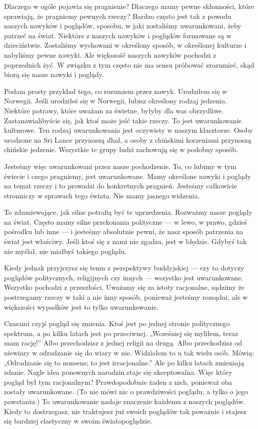 \documentclass[12pt,openany]{book}
\begin{document}
Dlaczego w ogóle pojawia się pragnienie? Dlaczego mamy pewne skłonności, które sprawiają, że pragniemy pewnych rzeczy? Bardzo często jest tak z powodu naszych nawyków i poglądów, sposobu, w jaki zostaliśmy uwarunkowani, żeby patrzeć na świat. Niektóre z naszych nawyków i poglądów formowane są w dzieciństwie. Zostaliśmy wychowani w określony sposób, w określonej kulturze i nabyliśmy pewne nawyki. Ale większość naszych nawyków pochodzi z poprzednich żyć. W związku z tym często nie ma sensu próbować zrozumieć, skąd biorą się nasze nawyki i poglądy.

Podam prosty przykład tego, co rozumiem przez nawyk. Urodziłem się w Norwegii. Jeśli urodziłeś się w Norwegii, lubisz określony rodzaj jedzenia. Niektóre potrawy, które uważam za świetne, byłyby dla was obrzydliwe. Zastanawialibyście się, jak ktoś może jeść takie rzeczy. To jest uwarunkowanie kulturowe. Ten rodzaj uwarunkowania jest oczywisty w naszym klasztorze. Osoby urodzone na Sri Lance przynoszą dhal, a osoby z chińskimi korzeniami przynoszą chińskie jedzenie. Wszystkie te grupy ludzi zachowują się w podobny sposób.

Jesteśmy więc uwarunkowani przez nasze pochodzenie. To, co lubimy w tym świecie i czego pragniemy, jest uwarunkowane. Mamy określone nawyki i poglądy na temat rzeczy i to prowadzi do konkretnych pragnień. Jesteśmy całkowicie stronniczy w sprawach tego świata. Nie mamy jasnego widzenia.

To zdumiewające, jak silne potrafią być te uprzedzenia. Rozważmy nasze poglądy na świat. Często mamy silne przekonania polityczne --- w lewo, w prawo, gdzieś pośrodku lub inne --- i jesteśmy absolutnie pewni, że nasz sposób patrzenia na świat jest właściwy. Jeśli ktoś się z nami nie zgadza, jest w błędzie. Gdybyś tak nie myślał, nie miałbyś takiego poglądu.

Kiedy jednak przyjrzysz się temu z perspektywy buddyjskiej --- czy to dotyczy poglądów politycznych, religijnych czy innych --- wszystko jest uwarunkowane. Wszystko pochodzi z przeszłości. Uważamy się za istoty racjonalne, sądzimy że postrzegamy rzeczy w taki a nie inny sposób, ponieważ jesteśmy rozsądni, ale w większości wypadków jest to tylko uwarunkowanie.

Czasami czyjś pogląd się zmienia. Ktoś jest po jednej stronie politycznego spektrum, a po kilku latach jest po przeciwnej. „Wcześniej się myliłem, teraz mam rację!” Albo przechodzisz z jednej religii na drugą. Albo przechodzisz od niewiary w odradzanie się do wiary w nie. Widziałem to u tak wielu osób. Mówią: „Odradzanie się to nonsens; to jest irracjonalne.” Ale po kilku latach zmieniają zdanie. Nagle idea ponownych narodzin staje się akceptowalna. Więc który pogląd był tym racjonalnym? Prawdopodobnie żaden z nich, ponieważ oba zostały uwarunkowane. (To nie mówi nic o prawdziwości poglądu, a tylko o jego powstaniu.) To uwarunkowanie nadaje znaczenie każdemu z naszych poglądów. Kiedy to dostrzegasz, nie traktujesz już swoich poglądów tak poważnie i stajesz się bardziej elastyczny w swoim światopoglądzie.
\end{document}
